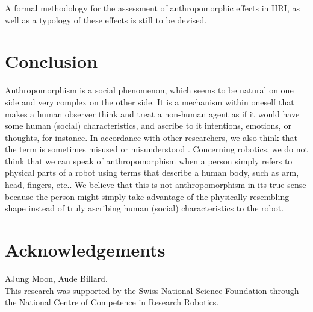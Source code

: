 \documentclass{acm_proc_article-sp}
\begin{document}
A formal methodology for the assessment of anthropomorphic effects in HRI, as
well as a typology of these effects is still to be devised.


\section{Conclusion}
\label{sec:9}


Anthropomorphism is a social phenomenon, which seems to be natural on one side
and very complex on the other side. It is a mechanism within oneself that makes
a human observer think and treat a non-human agent as if it would have some
human (social) characteristics, and ascribe to it intentions, emotions, or
thoughts, for instance. In accordance with other researchers, we also think
that the term is sometimes misused or misunderstood
\cite{duffy_anthropomorphism_2002}. Concerning robotics, we do not think that
we can speak of anthropomorphism when a person simply refers to physical parts
of a robot using terms that describe a human body, such as arm, head, fingers,
etc.. We believe that this is not anthropomorphism in its true sense because
the person might simply take advantage of the physically resembling shape
instead of truly ascribing human (social) characteristics to the robot.



\section*{Acknowledgements}
AJung Moon, Aude Billard.\\

This research was supported by the Swiss National Science Foundation through
the National Centre of Competence in Research Robotics.



 
\balancecolumns
\end{document}
